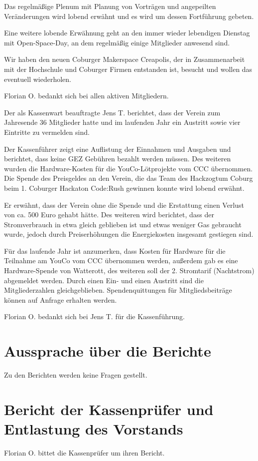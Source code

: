 Das regelmäßige Plenum mit Planung von Vorträgen und angepeilten Veränderungen wird lobend erwähnt und es wird um dessen Fortführung gebeten.

Eine weitere lobende Erwähnung geht an den immer wieder lebendigen Dienstag mit Open-Space-Day, an dem regelmäßig einige Mitglieder anwesend sind.

Wir haben den neuen Coburger Makerspace Creapolis, der in Zusammenarbeit mit der Hochschule und Coburger Firmen entstanden ist, besucht und wollen das eventuell wiederholen.

Florian O. bedankt sich bei allen aktiven Mitgliedern.

Der als Kassenwart beauftragte Jens T. berichtet, dass der Verein zum Jahresende 36 Mitglieder hatte und im laufenden Jahr ein Austritt sowie vier Eintritte zu vermelden sind.

Der Kassenführer zeigt eine Auflistung der Einnahmen und Ausgaben und berichtet, dass keine GEZ Gebühren bezahlt werden müssen.
Des weiteren wurden die Hardware-Kosten für die YouCo-Lötprojekte vom CCC übernommen.
Die Spende des Preisgeldes an den Verein, die das Team des Hackzogtum Coburg beim 1. Coburger Hackaton Code:Rush gewinnen konnte wird lobend erwähnt.

Er erwähnt, dass der Verein ohne die Spende und die Erstattung einen Verlust von ca. 500 Euro gehabt hätte.
Des weiteren wird berichtet, dass der Stromverbrauch in etwa gleich geblieben ist und etwas weniger Gas gebraucht wurde, jedoch durch Preiserhöhungen die Energiekosten insgesamt gestiegen sind.

Für das laufende Jahr ist anzumerken, dass Kosten für Hardware für die Teilnahme am YouCo vom CCC übernommen werden, außerdem gab es eine Hardware-Spende von Watterott, des weiteren soll der 2. Stromtarif (Nachtstrom) abgemeldet werden. Durch einen Ein- und einen Austritt sind die Mitgliederzahlen gleichgeblieben. Spendenquittungen für Mitgliedsbeiträge können auf Anfrage erhalten werden.

Florian O. bedankt sich bei Jens T. für die Kassenführung.



\section{Aussprache über die Berichte}
Zu den Berichten werden keine Fragen gestellt.

\section{Bericht der Kassenprüfer und Entlastung des Vorstands}
Florian O. bittet die Kassenprüfer um ihren Bericht.

